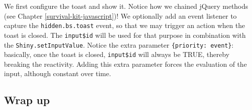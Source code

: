 \documentclass[
]{book}
\newenvironment{Shaded}{\begin{snugshade}}{\end{snugshade}}
\newcommand{\ControlFlowTok}[1]{\textcolor[rgb]{0.13,0.29,0.53}{\textbf{#1}}}
\newcommand{\DataTypeTok}[1]{\textcolor[rgb]{0.13,0.29,0.53}{#1}}
\newcommand{\DecValTok}[1]{\textcolor[rgb]{0.00,0.00,0.81}{#1}}
\newcommand{\KeywordTok}[1]{\textcolor[rgb]{0.13,0.29,0.53}{\textbf{#1}}}
\newcommand{\NormalTok}[1]{#1}
\newcommand{\OperatorTok}[1]{\textcolor[rgb]{0.81,0.36,0.00}{\textbf{#1}}}
\newcommand{\OtherTok}[1]{\textcolor[rgb]{0.56,0.35,0.01}{#1}}
\newcommand{\StringTok}[1]{\textcolor[rgb]{0.31,0.60,0.02}{#1}}
\begin{document}
We first configure the toast and show it. Notice how we chained jQuery methods (see Chapter \ref{survival-kit-javascript})! We optionally add an event listener to capture the \texttt{hidden.bs.toast} event, so that we may trigger an action when the toast is closed. The \texttt{input\$id} will be used for that purpose in combination with the \texttt{Shiny.setInputValue}. Notice the extra parameter \texttt{\{priority:\ \textquotesingle{}event\textquotesingle{}\}}: basically, once the toast is closed, \texttt{input\$id} will always be TRUE, thereby breaking the reactivity. Adding this extra parameter forces the evaluation of the input, although constant over time.

\hypertarget{wrap-up}{%
\subsection{Wrap up}\label{wrap-up}}

\begin{Shaded}
\end{Shaded}
\end{document}
